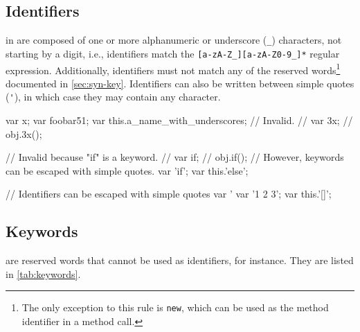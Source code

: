 \subsection{Identifiers}
\label{sec:us-syn-id}

 in \us are composed of one or more alphanumeric or
underscore (\lstinline|_|) characters, not starting by a digit, i.e.,
identifiers match the \lstinline|[a-zA-Z_][a-zA-Z0-9_]*| regular
expression.  Additionally, identifiers must not match any of the \us
reserved words\footnote{
  The only exception to this rule is \lstinline|new|, which can be
  used as the method identifier in a method call.
} documented in \autoref{sec:syn-key}. Identifiers can also be written
between simple quotes (\lstinline|'|), in which case they may contain
any character.

\begin{urbiscript}
var x;
var foobar51;
var this.a_name_with_underscores;
// Invalid.
// var 3x;
// obj.3x();

// Invalid because "if" is a keyword.
// var if;
// obj.if();
// However, keywords can be escaped with simple quotes.
var 'if';
var this.'else';

// Identifiers can be escaped with simple quotes
var '%
var '1 2 3';
var this.'[]';
\end{urbiscript}

\subsection{Keywords}
\label{sec:syn-key}

 are reserved words that cannot be used as identifiers,
for instance.  They are listed in \autoref{tab:keywords}.

